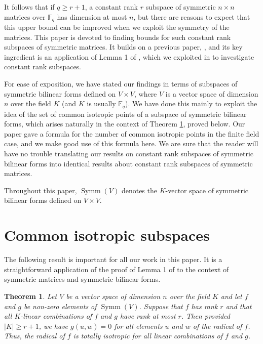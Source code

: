 \documentclass{amsart}
\DeclareMathOperator{\Symm}{Symm}
\theoremstyle{plain}
\newtheorem{theorem}{Theorem}
\theoremstyle{definition}
\begin{document}
It follows that if $q\geq r+1$, a constant rank $r$ subspace of symmetric $n\times n$ matrices over $\mathbb{F}_q$ has dimension at most $n$, but there are reasons to expect that this upper bound can be improved when we exploit the symmetry of the matrices. This paper is devoted to finding
bounds for such constant rank subspaces of symmetric matrices. It builds on a previous paper, \cite{DGS}, and its key ingredient is an application of Lemma 1 of \cite{Fill}, which we exploited in \cite{Gow} to investigate constant rank subspaces.

For ease of exposition, we have stated our findings in terms of subspaces of symmetric bilinear forms defined on $V\times V$, where $V$ is a vector space of dimension $n$ over the field $K$ (and $K$ is usually $\mathbb{F}_q$). We have done this mainly to exploit the idea of the set
of common isotropic points of a subspace of symmetric bilinear forms, which arises naturally in the context of Theorem \ref{radical_totally_isotropic}, proved below. Our paper \cite{DGS} gave a formula for the number of common isotropic points in the finite field case, and we make good use of this formula
here. We are sure that the reader will have no trouble translating our results on constant rank subspaces of symmetric bilinear forms into identical results about constant rank subspaces of symmetric matrices. 

Throughout this paper, $\Symm(V)$ denotes the $K$-vector space of symmetric bilinear forms defined on $V\times V$.

\section{Common isotropic subspaces}

\noindent The following result is important for all our work in this paper. It is a straightforward application of the proof of Lemma 1
of \cite{Fill} to the context of symmetric matrices and symmetric bilinear forms.


\begin{theorem} \label{radical_totally_isotropic} Let $V$ be a vector space of dimension $n$ over the field $K$ and let $f$ and $g$ be non-zero elements of $\Symm(V)$. Suppose that $f$ has rank $r$ and that all $K$-linear combinations of $f$ and $g$ have rank
at most $r$. Then provided $|K|\geq r+1$, we have $g(u,w)=0$ for all elements $u$ and $w$ of the radical of $f$. Thus, the radical of $f$
is totally isotropic for all linear combinations of $f$ and $g$.

 
\end{theorem}
\end{document}
